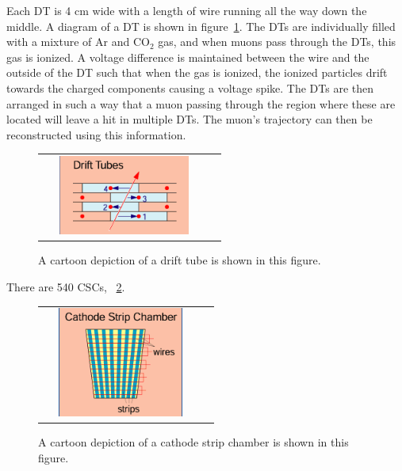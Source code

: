 Each DT is 4 cm wide with a length of wire running all the way down the middle.
A diagram of a DT is shown in figure~\ref{fig:DT}.
The DTs are individually filled with a mixture of Ar and $\mathrm{CO_{2}}$ gas, and when muons pass through the DTs, this gas is ionized.
A voltage difference is maintained between the wire and the outside of the DT such that when the gas is ionized,
the ionized particles drift towards the charged components causing a voltage spike.
The DTs are then arranged in such a way that a muon passing through the region where these are located will leave a hit in multiple DTs.
The muon's trajectory can then be reconstructed using this information.

\begin{figure}[!ht]
\begin{center}
\begin{tabular}{cc}
\includegraphics[width=0.8\textwidth]{cms/figs/DT.png}
\end{tabular}
\caption{ A cartoon depiction of a drift tube is shown in this figure. 
\label{fig:DT}
}
\end{center}
\end{figure}

There are 540 CSCs, ~\ref{fig:CSC}.

\begin{figure}[!ht]
\begin{center}
\begin{tabular}{cc}
\includegraphics[width=0.8\textwidth]{cms/figs/CSC.png}
\end{tabular}
\caption{ A cartoon depiction of a cathode strip chamber is shown in this figure. 
\label{fig:CSC}
}
\end{center}
\end{figure}

